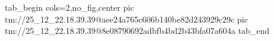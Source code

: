  
 
 
 
 

\qqSecOrig


\ifcmt
  tab_begin cols=2,no_fig,center
    pic tm://25_12_22.18.39.39@aee24a765c606b140be82d243929c29c
    pic tm://25_12_22.18.39.39@8e08790692adbfb4bd2b43bfa07a604a
  tab_end
\fi

